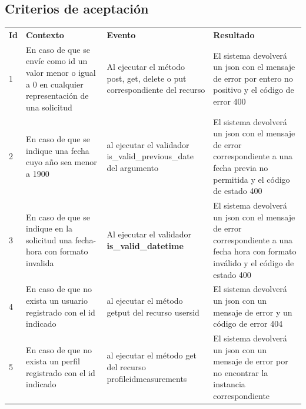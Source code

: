 \subsection{Criterios de aceptación}

\begin{center}
\begin{longtable}{|p{0.5cm}|p{4cm}|p{4cm}|p{5cm}|}
\hline \hline \rowcolor[gray]{0.9}
	\multicolumn{4}{||c|}{\textbf{Criterio de aceptación}} \\
    \hline  \rowcolor[gray]{0.9}
        \textbf{Id} &
        \textbf{Contexto} &
        \textbf{Evento}&
        \textbf{Resultado} \\
    \hline
1&En caso de que se envíe como id un valor menor o igual a 0 en cualquier representación  de una solicitud & Al ejecutar el método post, get, delete o put correspondiente del recurso & El sistema devolverá un json con el mensaje de error por entero no positivo y el código de error 400 \\ \hline
	\hline
2&En caso de que se indique una fecha cuyo año sea menor a 1900 & al ejecutar el validador is\_valid\_previous\_date del argumento  & El sistema devolverá un json con el mensaje de error correspondiente a una fecha previa no permitida y el código de estado 400 \\ 		\hline
	\hline
3&En caso de que se indique en la solicitud una fecha-hora con formato invalida 
& Al ejecutar el validador \textbf{ is\_valid\_datetime}  & El sistema devolverá un json con el mensaje de error correspondiente a una fecha hora con formato inválido y el código de estado 400\\ \hline
    \hline
4&En caso de que no exista un usuario registrado con el id indicado & al ejecutar el método get\/put del recurso \/users\/id  & El sistema devolverá un json con un mensaje de error y un código de error 404 \\ \hline
	\hline
5&En caso de que no exista un perfil registrado con el id indicado & al ejecutar el método get del recurso \/profile\/id\/measurements  & El sistema devolverá un json con un mensaje de error por no encontrar la instancia correspondiente \\ \hline

  \end{longtable}
\end{center}

